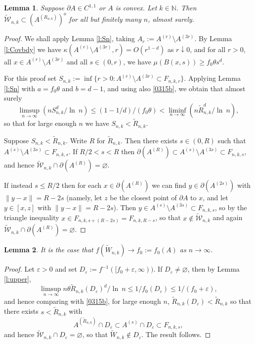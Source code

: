 \documentclass[12pt]{article}
\newcommand{\N}{\mathbb{N}}
\newcommand{\tcW}{\widetilde{\mathcal{W}}}
\newcommand{\tW}{\tilde{W}}
\renewcommand{\emptyset}{\varnothing}
\newcommand{\tR}{{\tilde{R}}}
\newcommand{\eps}{\varepsilon}
\renewcommand{\log}{{\ln \:}}
\newtheorem{lemm}{Lemma}
\begin{document}
\begin{lemm}
	\label{l:tWinint}
	Suppose $\partial A \in C^{1,1}$ or $A$ is convex.
	Let $k \in \N$.
	Then
	$\tcW_{n,k } \subset (A^{(R_{n,k})})^o  $ 
	for all but finitely many $n$,
	almost surely.
\end{lemm}
\begin{proof}
	We shall apply Lemma
	\ref{l:Sn}, taking $A_r := A^{(r)} \setminus A^{(3r)}$.
	By Lemma \ref{l:Covbdy}
	we have $\kappa(A^{(r)} \setminus A^{(3r)},r ) = O(r^{1-d}) $
	as $ r \downarrow 0$,
	and for all $r >0$, all $x \in 
	A^{(r)} \setminus A^{(3r)}$ and all $s \in (0,r)$, we have
	$\mu(B(x,s)) \geq f_0 
	\theta s^d$.

	For this proof set
	$S_{n,k}:= \inf \{r>0: A^{(r)} \setminus A^{(3r)} \subset
	F_{n,k,r}\}$. 
	 Applying Lemma \ref{l:Sn} with 
	 $a= f_0 \theta$ 
	 and 
	 $b = d-1$, 
	 and using also \eqref{0315b},
	 we obtain that almost surely
	 $$
	 \limsup_{n \to \infty} (n S_{n,k}^d/\log n)
	 \leq (1-1/d)/(f_0 \theta)
	 < \liminf_{n \to \infty} ( n \tR_{n,k}^d/\log n),
	 $$
	 so that for large enough $n$ we have $S_{n,k} < \tR_{n,k}$.

	 Suppose $S_{n,k} < \tR_{n,k}$. Write $R$
	 for $\tR_{n,k}$. Then there exists $s \in (0, R)$ such that
	 $A^{(s)} \setminus A^{(3s)} \subset F_{n,k,s}$.
	 If $R/2 < s <R$ then
	 $\partial(A^{(R)}) \subset A^{(s)} \setminus A^{(3s)}
	 \subset F_{n,k,s}$,
	 and hence $\tcW_{n,k} \cap \partial (A^{(R)}) = \emptyset$.

	 If instead $s \leq R/2$ then for each $x \in \partial(A^{(R)})$
	 we can find $y \in \partial(A^{(2s)})$
	 with $\|y-x\| = R-2s$
	 (namely, let $z $ be the closest point of $\partial A$ to $x$,
	 and let $y \in [x,z]$ with $\|y-x\| = R-2s$).
	 Then $y \in A^{(s)} \setminus A^{(3s)} \subset F_{n,k,s}$, so
	 by the triangle inequality
	 $x \in F_{n,k,s+(R-2s)} = F_{n,k,R-s}$, so that $x \notin 
	 \tcW_{n,k}$ and again
	 $\tcW_{n,k} \cap \partial (A^{(R)}) = \emptyset$.
\end{proof}
\begin{lemm}
	\label{l:fconv}
	It is the case that $f(\tW_{n,k}) \to f_0 := f_0(A)$
	as $n \to \infty$.
\end{lemm}
\begin{proof}
	Let $\eps >0$ and set $D_\eps:= 
	f^{-1}([f_0+  \eps,\infty))$.  If $D_\eps \neq \emptyset$,
	then %
	by %
	Lemma \ref{l:upper},
	$$
	\limsup_{n \to \infty} n \theta
	\tR_{n,k}(D_\eps)^d/\log n \leq 1/f_0(D_\eps) \leq 1/(f_0+ \eps),
	$$
	and hence comparing with \eqref{0315b},  for large enough $n$, 
	$\tR_{n,k}(D_\eps) < \tR_{n,k}$ so that there exists
	$s < \tR_{n,k}$ with
	$$
	A^{(\tR_{n,k})} \cap D_\eps \subset A^{(s)} \cap D_\eps
	\subset F_{n,k,s},
	$$
	and hence $\tcW_{n,k} \cap D_\eps = \emptyset$, so that 
	$\tW_{n,k} \notin D_\eps$. %
	The result follows.
\end{proof}
\end{document}

